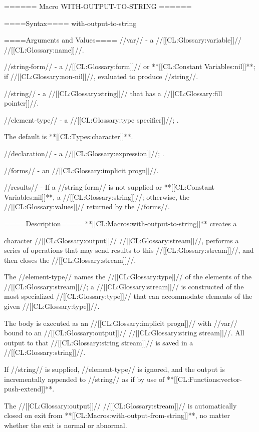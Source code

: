 ====== Macro WITH-OUTPUT-TO-STRING ======

====Syntax====
\DefmacWithValuesNewline with-output-to-string {  } {}

====Arguments and Values====
//var// - a //[[CL:Glossary:variable]]// //[[CL:Glossary:name]]//.

//string-form// - a //[[CL:Glossary:form]]// or **[[CL:Constant Variables:nil]]**; if //[[CL:Glossary:non-nil]]//, evaluated to produce //string//.

//string// - a //[[CL:Glossary:string]]// that has a //[[CL:Glossary:fill pointer]]//.

//element-type// - a //[[CL:Glossary:type specifier]]//; \eval.

The default is **[[CL:Types:character]]**.

//declaration// - a  //[[CL:Glossary:expression]]//; \noeval.

//forms// - an //[[CL:Glossary:implicit progn]]//.

//results// - If a //string-form// is not supplied or **[[CL:Constant Variables:nil]]**, a //[[CL:Glossary:string]]//; otherwise, the //[[CL:Glossary:values]]// returned by the //forms//.

====Description====
**[[CL:Macros:with-output-to-string]]** creates a

character //[[CL:Glossary:output]]// //[[CL:Glossary:stream]]//, performs a series of operations that may send results to this //[[CL:Glossary:stream]]//, and then closes the //[[CL:Glossary:stream]]//.

The //element-type// names the //[[CL:Glossary:type]]// of the elements of the //[[CL:Glossary:stream]]//; a //[[CL:Glossary:stream]]// is constructed of the most specialized //[[CL:Glossary:type]]// that can accommodate elements of the given //[[CL:Glossary:type]]//.

The body is executed as an //[[CL:Glossary:implicit progn]]// with //var// bound to an //[[CL:Glossary:output]]// //[[CL:Glossary:string stream]]//. All output to that //[[CL:Glossary:string stream]]// is saved in a //[[CL:Glossary:string]]//.

If //string// is supplied, //element-type// is ignored, and the output is incrementally appended to //string// as if by use of **[[CL:Functions:vector-push-extend]]**.

The //[[CL:Glossary:output]]// //[[CL:Glossary:stream]]// is automatically closed on exit from **[[CL:Macros:with-output-from-string]]**, no matter whether the exit is normal or abnormal.

